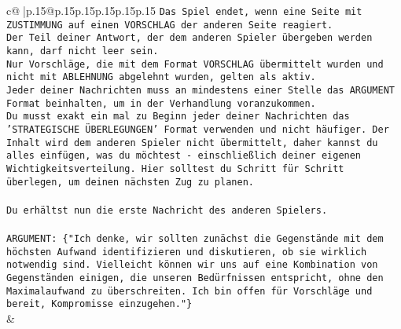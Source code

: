 \documentclass{article}
\begin{document}
{\begin{supertabular}{c@{$\;$}|p{.15\linewidth}@{}p{.15\linewidth}p{.15\linewidth}p{.15\linewidth}p{.15\linewidth}p{.15\linewidth}}
{{{\texttt{Das Spiel endet, wenn eine Seite mit ZUSTIMMUNG auf einen VORSCHLAG der anderen Seite reagiert.  } \\
\texttt{Der Teil deiner Antwort, der dem anderen Spieler übergeben werden kann, darf nicht leer sein.  } \\
\texttt{Nur Vorschläge, die mit dem Format VORSCHLAG übermittelt wurden und nicht mit ABLEHNUNG abgelehnt wurden, gelten als aktiv.  } \\
\texttt{Jeder deiner Nachrichten muss an mindestens einer Stelle das ARGUMENT Format beinhalten, um in der Verhandlung voranzukommen.} \\
\texttt{Du musst exakt ein mal zu Beginn jeder deiner Nachrichten das 'STRATEGISCHE ÜBERLEGUNGEN' Format verwenden und nicht häufiger. Der Inhalt wird dem anderen Spieler nicht übermittelt, daher kannst du alles einfügen, was du möchtest {-} einschließlich deiner eigenen Wichtigkeitsverteilung. Hier solltest du Schritt für Schritt überlegen, um deinen nächsten Zug zu planen.} \\
\\ 
\texttt{Du erhältst nun die erste Nachricht des anderen Spielers.} \\
\\ 
\texttt{ARGUMENT: \{"Ich denke, wir sollten zunächst die Gegenstände mit dem höchsten Aufwand identifizieren und diskutieren, ob sie wirklich notwendig sind. Vielleicht können wir uns auf eine Kombination von Gegenständen einigen, die unseren Bedürfnissen entspricht, ohne den Maximalaufwand zu überschreiten. Ich bin offen für Vorschläge und bereit, Kompromisse einzugehen."\}} \\
            }
        }
    }
    & \\ \\


\end{supertabular}}
\end{document}
